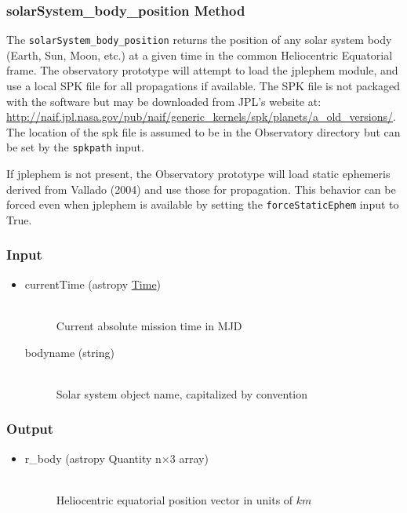\documentclass[cleanfoot]{asme2ej}
\begin{document}
\subsubsection{solarSystem\_body\_position Method}\label{sec:ssbPosTask}
The \verb+solarSystem_body_position+ returns the position of any solar system body (Earth, Sun, Moon, etc.) at a given time in the common Heliocentric Equatorial frame.  The observatory prototype will attempt to load the jplephem module, and use a local SPK file for all propagations if available.  The SPK file is not packaged with the software but may be downloaded from JPL's website at: \url{http://naif.jpl.nasa.gov/pub/naif/generic_kernels/spk/planets/a_old_versions/}.  The location of the spk file is assumed to be in the Observatory directory but can be set by the \verb+spkpath+ input.  

If jplephem is not present, the Observatory prototype will load static ephemeris derived from Vallado (2004) and use those for propagation.  This behavior can be forced even when jplephem is available by setting the \verb+forceStaticEphem+ input to True.

\subsubsection*{Input}
\begin{itemize}
\item
\begin{description}
    \item[currentTime (astropy \href{http://astropy.readthedocs.org/en/latest/time/index.html}{Time})] \hfill \\ Current absolute mission time in MJD
    \item[bodyname (string)] \hfill \\ Solar system object name, capitalized by convention
\end{description}
\end{itemize}

\subsubsection*{Output}
\begin{itemize}
\item
\begin{description}
    \item[r\_body (astropy Quantity n$\times$3 array)] \hfill \\ Heliocentric equatorial position vector in units of $ km $
\end{description}
\end{itemize}
\end{document}
